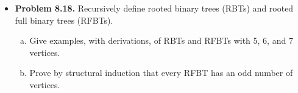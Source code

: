\documentclass[11pt]{article}
\begin{document}
\begin{itemize}
\vspace{0.1in}

\item \textbf{Problem 8.18.}
Recursively define rooted binary trees (RBTs) and rooted full binary trees (RFBTs).
\begin{enumerate}[(a)]
\item Give examples, with derivations, of RBTs and RFBTs with 5, 6, and 7 vertices.
\item Prove by structural induction that every RFBT has an odd number of vertices.
\end{enumerate}

\end{itemize}
\end{document}
